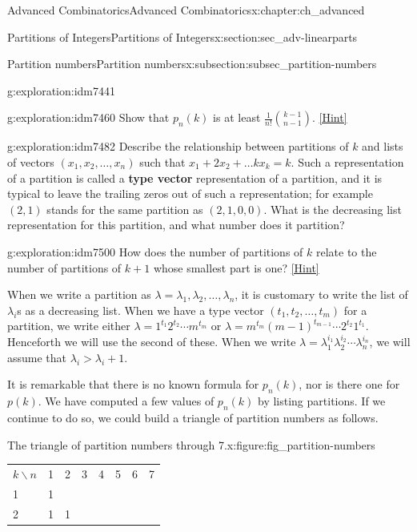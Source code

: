 \documentclass[oneside,10pt,]{book}
\newcommand{\terminology}[1]{\textbf{#1}}
\numberwithin{equation}{chapter}
\newcommand{\hrulethin}  {\noalign{\hrule height 0.04em}}
\begin{document}
\begin{chapterptx}{Advanced Combinatorics}{}{Advanced Combinatorics}{}{}{x:chapter:ch_advanced}
\begin{sectionptx}{Partitions of Integers}{}{Partitions of Integers}{}{}{x:section:sec_adv-linearparts}
\begin{subsectionptx}{Partition numbers}{}{Partition numbers}{}{}{x:subsection:subsec_partition-numbers}
\begin{exploration}{}{g:exploration:idm7441}
\end{exploration}
\begin{exploration}{}{g:exploration:idm7460}%
Show that \(p_n(k)\) is at least \(\frac{1}{n!}\binom{k-1}{n-1}\).%
\space\hspace*{0pt}\hfill{\tiny\hyperlink{g:hint:idm7465-back}{[Hint]}}\end{exploration}
\begin{exploration}{}{g:exploration:idm7482}%
Describe the relationship between partitions of \(k\) and lists of vectors \((x_1,x_2,\ldots,x_n)\) such that \(x_1+2x_2+\ldots kx_k = k\).  Such a representation of a partition is called a \terminology{type vector} representation of a partition, and it is typical to leave the trailing zeros out of such a representation; for example \((2,1)\) stands for the same partition as \((2,1,0,0)\). What is the decreasing list representation for this partition, and what number does it partition?%
\end{exploration}
\begin{exploration}{}{g:exploration:idm7500}%
How does the number of partitions of \(k\) relate to the number of partitions of \(k+1\) whose smallest part is one?%
\space\hspace*{0pt}\hfill{\tiny\hyperlink{g:hint:idm7505-back}{[Hint]}}\end{exploration}
When we write a partition as \(\lambda = \lambda_1,\lambda_2,\ldots,\lambda_n\), it is customary to write the list of \(\lambda_i\)s as a decreasing list. When we have a type vector \((t_1,t_2,\ldots,t_m)\) for a partition, we write either \(\lambda = 1^{t_1}2^{t_2}\cdots m^{t_m}\) or \(\lambda = m^{t_m}(m-1)^{t_{m-1}}\cdots 2^{t_2}1^{t_1}\). Henceforth we will use the second of these. When we write \(\lambda=\lambda_1^{i_1}\lambda_2^{i_2}\cdots\lambda_n^{i_n}\), we will assume that \(\lambda_i>\lambda_i+1\).%
\par
It is remarkable that there is no known formula for \(p_n(k)\), nor is there one for \(p(k)\). We have computed a few values of \(p_n(k)\) by listing partitions.  If we continue to do so, we could build a triangle of partition numbers as follows.%
\begin{figureptx}{The triangle of partition numbers through 7.}{x:figure:fig_partition-numbers}%
\centering
\begin{tabular}{llllllll}
\(k\backslash n\)&1&2&3&4&5&6&7\tabularnewline\hrulethin
1&1&&&&&&\tabularnewline[0pt]
2&1&1&&&&&\tabularnewline[0pt]

\end{tabular}
\end{figureptx}
\end{subsectionptx}
\end{sectionptx}
\end{chapterptx}
\end{document}
